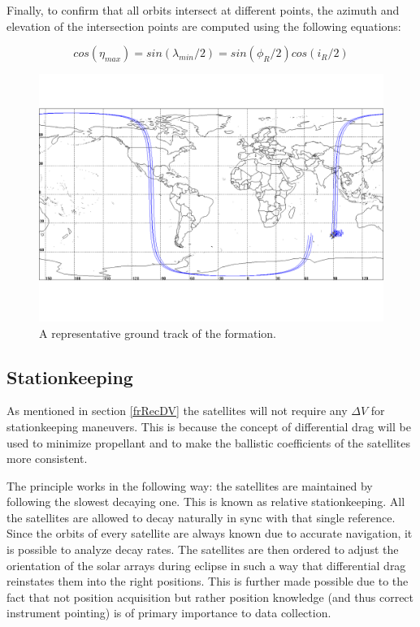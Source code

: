 Finally, to confirm that all orbits intersect at different points, the azimuth and elevation of the intersection points are computed using the following equations:

\begin{equation}
cos(\eta_{max} ) = sin(\lambda _{min}/2) = sin(\phi _R/2)cos(i_R/2)
\end{equation} 



\begin{landscape}
\begin{figure}[ht!]
\centering
\includegraphics[width = \textwidth]{chapters/img/ground.png}
\caption{A representative ground track of the formation.}
\label{fig:ground}
\end{figure}
\end{landscape}

\subsection{Stationkeeping}
\label{frSSStation}

As mentioned in section \ref{frRecDV} the satellites will not require any $\Delta V$ for stationkeeping maneuvers. This is because the concept of differential drag will be used to minimize propellant and to make the ballistic coefficients of the satellites more consistent.

The principle works in the following way: the satellites are maintained by following the slowest decaying one. This is known as relative stationkeeping. All the satellites are allowed to decay naturally in sync with that single reference. Since the orbits of every satellite are always known due to accurate navigation, it is possible to analyze decay rates. The satellites are then ordered to adjust the orientation of the solar arrays during eclipse in such a way that differential drag reinstates them into the right positions. This is further made possible due to the fact that not position acquisition but rather position knowledge (and thus correct instrument pointing) is of primary importance to data collection.

